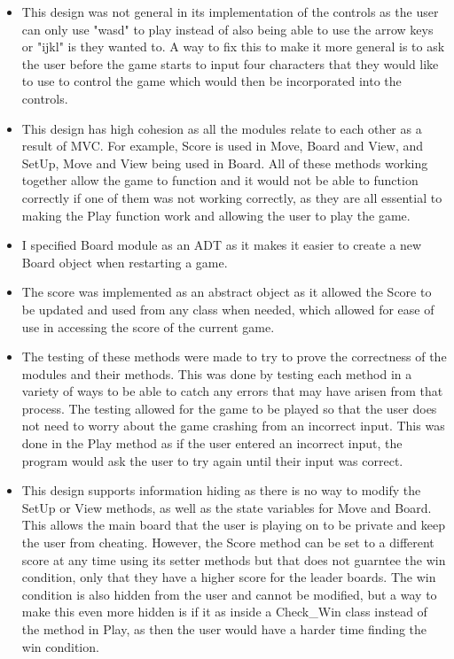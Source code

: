\documentclass[12pt]{article}
\begin{document}
\begin{itemize}
\item This design was not general in its implementation of the controls as the user can only use "wasd" to play instead of also being able to use the arrow keys or "ijkl" is they wanted to. A way to fix this to make it more general is to ask the user before the game starts to input four characters that they would like to use to control the game which would then be incorporated into the controls. 

\item This design has high cohesion as all the modules relate to each other as a result of MVC. For example, Score is used in Move, Board and View, and SetUp, Move and View being used in Board. All of these methods working together allow the game to function and it would not be able to function correctly if one of them was not working correctly, as they are all essential to making the Play function work and allowing the user to play the game. 

\item I specified Board module as an ADT as it makes it easier to create a new Board object when restarting a game. 

\item The score was implemented as an abstract object as it allowed the Score to be updated and used from any class when 
needed, which allowed for ease of use in accessing the score of the current game. 

\item The testing of these methods were made to try to prove the correctness of the modules and their methods. This was done by testing each method in a variety of ways to be able to catch any errors that may have arisen from that process. The testing allowed for the game to be played so that the user does not need to worry about the game crashing from an incorrect input. This was done in the Play method as if the user entered an incorrect input, the program would ask the user to try again until their input was correct. 

\item This design supports information hiding as there is no way to modify the SetUp or View methods, as well as the state variables for Move and Board. This allows the main board that the user is playing on to be private and keep the user from cheating. However, the Score method can be set to a different score at any time using its setter methods but that does not guarntee the win condition, only that they have a higher score for the leader boards. The win condition is also hidden from the user and cannot be modified, but a way to make this even more hidden is if it as inside a Check\_Win class instead of the method in Play, as then the user would have a harder time finding the win condition. 

\end{itemize}
\end{document}
